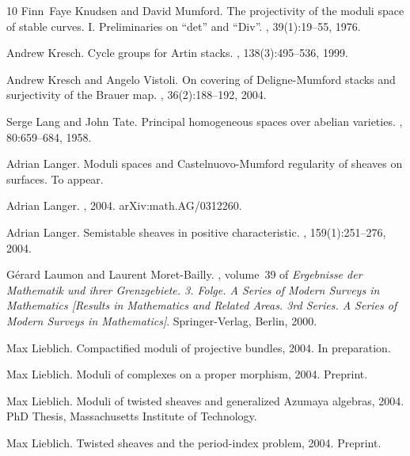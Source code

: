 \documentclass[11pt]{amsart}
\renewcommand{\[}{[\!\hspace{0.03em}[}
\renewcommand{\]}{]\!\hspace{0.03em}]}
\renewcommand{\(}{(\!\hspace{0.03em}(}
\renewcommand{\)}{)\!\hspace{0.03em})}
\theoremstyle{definition}
\theoremstyle{remark}
\begin{document}
\begin{thebibliography}{10}
Finn~Faye Knudsen and David Mumford.
\newblock The projectivity of the moduli space of stable curves. {I}.
  {P}reliminaries on ``det'' and ``{D}iv''.
, 39(1):19--55, 1976.

Andrew Kresch.
\newblock Cycle groups for {A}rtin stacks.
, 138(3):495--536, 1999.

Andrew Kresch and Angelo Vistoli.
\newblock On covering of {D}eligne-{M}umford stacks and surjectivity of the
  {B}rauer map.
, 36(2):188--192, 2004.

Serge Lang and John Tate.
\newblock Principal homogeneous spaces over abelian varieties.
, 80:659--684, 1958.

Adrian Langer.
\newblock Moduli spaces and {C}astelnuovo-{M}umford regularity of sheaves on
  surfaces.
\newblock To appear.

Adrian Langer.
, 2004.
\newblock arXiv:math.AG/0312260.

Adrian Langer.
\newblock Semistable sheaves in positive characteristic.
, 159(1):251--276, 2004.

G{\'e}rard Laumon and Laurent Moret-Bailly.
, volume~39 of {\em Ergebnisse der
  Mathematik und ihrer Grenzgebiete. 3. Folge. A Series of Modern Surveys in
  Mathematics [Results in Mathematics and Related Areas. 3rd Series. A Series
  of Modern Surveys in Mathematics]}.
\newblock Springer-Verlag, Berlin, 2000.

Max Lieblich.
\newblock Compactified moduli of projective bundles, 2004.
\newblock In preparation.

Max Lieblich.
\newblock Moduli of complexes on a proper morphism, 2004.
\newblock Preprint.

Max Lieblich.
\newblock Moduli of twisted sheaves and generalized {A}zumaya algebras, 2004.
\newblock PhD Thesis, Massachusetts Institute of Technology.

Max Lieblich.
\newblock Twisted sheaves and the period-index problem, 2004.
\newblock Preprint.


\end{thebibliography}
\end{document}
